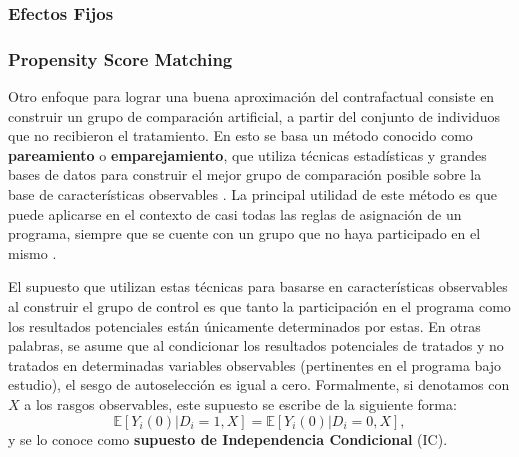 \documentclass[../../main.tex]{subfiles}
\begin{document}


\subsubsection{Efectos Fijos}

\subsubsection{Propensity Score Matching}

Otro enfoque para lograr una buena aproximación del contrafactual consiste en construir un grupo de comparación artificial, a partir del conjunto de individuos que no recibieron el tratamiento. En esto se basa un método conocido como \textbf{pareamiento} o \textbf{emparejamiento}, que utiliza técnicas estadísticas y grandes bases de datos para construir el mejor grupo de comparación posible sobre la base de características observables \cite{gertler-2016}. La principal utilidad de este método es que puede aplicarse en el contexto de casi todas las reglas de asignación de un programa, siempre que se cuente con un grupo que no haya participado en el mismo \cite{gertler-2016}.

El supuesto que utilizan estas técnicas para basarse en características observables al construir el grupo de control es que tanto la participación en el programa como los resultados potenciales están únicamente determinados por estas. En otras palabras, se asume que al condicionar los resultados potenciales de tratados y no tratados en determinadas variables observables (pertinentes en el programa bajo estudio), el sesgo de autoselección es igual a cero. Formalmente, si denotamos con \(X\) a los rasgos observables, este supuesto se escribe de la siguiente forma:
\begin{equation}
    \mathbb{E}\left[Y_i(0)|D_i=1, X\right] = \mathbb{E}\left[Y_i(0)|D_i=0, X\right],
\end{equation}
y se lo conoce como \textbf{supuesto de Independencia Condicional} (IC). 
\end{document}
